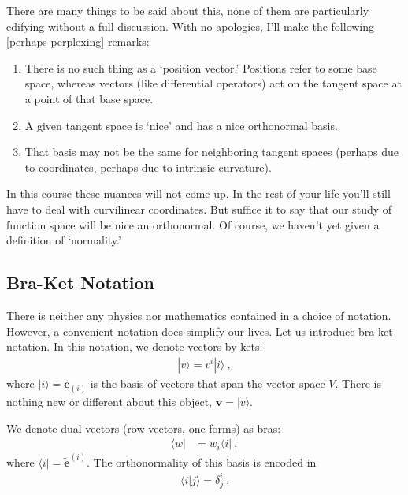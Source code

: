 \documentclass[12pt]{article}
\numberwithin{equation}{section}    %
\renewcommand{\tilde}{\widetilde}   %
\renewcommand{\vec}[1]{\mathbf{#1}} %
\begin{document}
There are many things to be said about this, none of them are particularly edifying without a full discussion. With no apologies, I’ll make the following [perhaps perplexing] remarks:
\begin{enumerate}
\item There is no such thing as a `position vector.' Positions refer to some base space, whereas vectors (like differential operators) act on the tangent space at a point of that base space. 
\item A given tangent space is `nice’ and has a nice orthonormal basis. 
\item That basis may not be the same for neighboring tangent spaces (perhaps due to coordinates, perhaps due to intrinsic curvature). 
\end{enumerate}
In this course these nuances will not come up. In the rest of your life you’ll still have to deal with curvilinear coordinates. But suffice it to say that our study of function space will be nice an orthonormal. Of course, we haven’t yet given a definition of `normality.’

\subsection{Bra-Ket Notation}

There is neither any physics nor mathematics contained in a choice of notation. However, a convenient notation does simplify our lives. Let us introduce bra-ket notation. In this notation, we denote vectors by kets:
\begin{align}
  |v\rangle = v^i|i\rangle \ ,
\end{align}
where $|i\rangle = \vec{e}_{(i)}$ is the basis of vectors that span the vector space $V$. There is nothing new or different about this object,  $\vec{v} = |v \rangle$.

We denote dual vectors (row-vectors, one-forms) as bras:
\begin{align}
  \langle w | &= w_i \langle i| \ ,
\end{align}
where $\langle i | = \tilde{\vec{e}}^{(i)}$. The orthonormality of this basis is encoded in 
\begin{align}
  \langle i | j \rangle = \delta^i_j \ .
\end{align}
\end{document}
